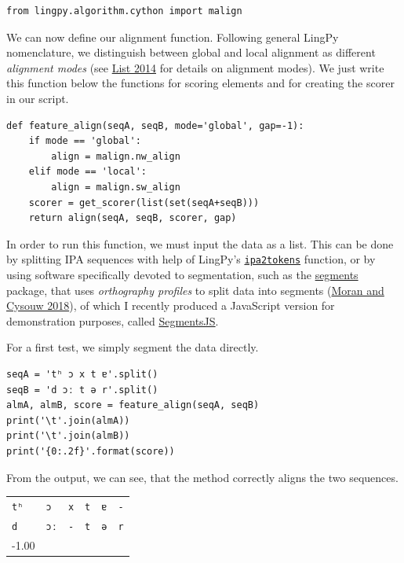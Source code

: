 \documentclass[
  a4paper,
  14pt,
  oneside,
  tablecaptionabove
]{scrbook}
\newcommand{\passthrough}[1]{#1}
\begin{document}
\begin{lstlisting}
from lingpy.algorithm.cython import malign
\end{lstlisting}

We can now define our alignment function. Following general LingPy
nomenclature, we distinguish between global and local alignment as
different \emph{alignment modes} (see
\href{http://bibliography.lingpy.org?key=List2014d}{List 2014} for
details on alignment modes). We just write this function below the
functions for scoring elements and for creating the scorer in our
script.

\begin{lstlisting}
def feature_align(seqA, seqB, mode='global', gap=-1):
    if mode == 'global':
        align = malign.nw_align
    elif mode == 'local':
        align = malign.sw_align
    scorer = get_scorer(list(set(seqA+seqB)))
    return align(seqA, seqB, scorer, gap)
\end{lstlisting}

In order to run this function, we must input the data as a list. This
can be done by splitting IPA sequences with help of LingPy's
\href{http://lingpy.org/reference/lingpy.sequence.html\#lingpy.sequence.sound_classes.ipa2tokens}{\passthrough{\lstinline!ipa2tokens!}}
function, or by using software specifically devoted to segmentation,
such as the \href{https://github.com/cldf/segments}{segments} package,
that uses \emph{orthography profiles} to split data into segments (\href{http://bibliography.lingpy.org?key=Moran2018}{Moran and Cysouw
2018}), of which I recently produced a JavaScript version for
demonstration purposes, called
\href{http://calc.digling.org/profile/}{SegmentsJS}.

For a first test, we simply segment the data directly.

\begin{lstlisting}
seqA = 'tʰ ɔ x t ɐ'.split()
seqB = 'd ɔː t ə r'.split()
almA, almB, score = feature_align(seqA, seqB)
print('\t'.join(almA))
print('\t'.join(almB))
print('{0:.2f}'.format(score))
\end{lstlisting}

From the output, we can see, that the method correctly aligns the two
sequences.

\begin{table}[]
\centering
\begin{tabular}{llllll}
\texttt{tʰ}    & \texttt{ɔ}  & \texttt{x} & \texttt{t} & \texttt{ɐ} & \texttt{-} \\
\texttt{d}     & \texttt{ɔː} & \texttt{-} & \texttt{t} & \texttt{ə} & \texttt{r} \\
-1.00 &    &   &   &   &  
\end{tabular}
\end{table}
\end{document}
